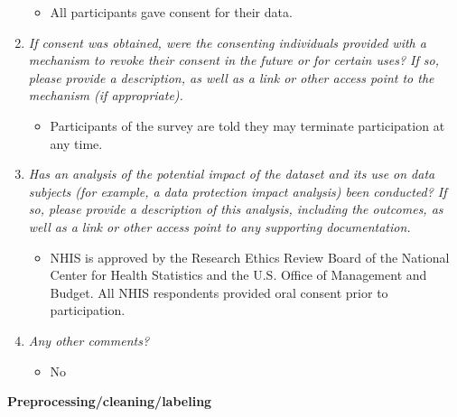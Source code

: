 \documentclass[
]{article}
\providecommand{\tightlist}{%
  \setlength{\itemsep}{0pt}\setlength{\parskip}{0pt}}
\begin{document}
\begin{enumerate}
  \begin{itemize}
  \tightlist
  \item
    All participants gave consent for their data.
  \end{itemize}
\item
  \emph{If consent was obtained, were the consenting individuals
  provided with a mechanism to revoke their consent in the future or for
  certain uses? If so, please provide a description, as well as a link
  or other access point to the mechanism (if appropriate).}

  \begin{itemize}
  \tightlist
  \item
    Participants of the survey are told they may terminate participation
    at any time.
  \end{itemize}
\item
  \emph{Has an analysis of the potential impact of the dataset and its
  use on data subjects (for example, a data protection impact analysis)
  been conducted? If so, please provide a description of this analysis,
  including the outcomes, as well as a link or other access point to any
  supporting documentation.}

  \begin{itemize}
  \tightlist
  \item
    NHIS is approved by the Research Ethics Review Board of the National
    Center for Health Statistics and the U.S. Office of Management and
    Budget. All NHIS respondents provided oral consent prior to
    participation.
  \end{itemize}
\item
  \emph{Any other comments?}

  \begin{itemize}
  \tightlist
  \item
    No
  \end{itemize}
\end{enumerate}

\textbf{Preprocessing/cleaning/labeling}
\end{document}
